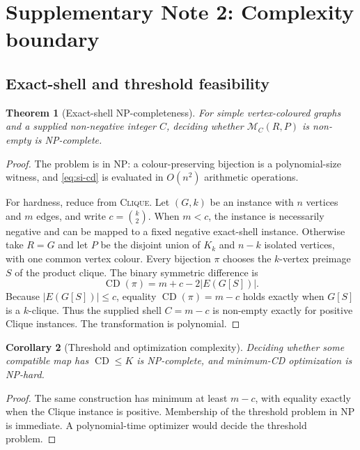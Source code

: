 \documentclass[11pt]{article}
\newtheorem{theorem}{Theorem}[section]
\newtheorem{corollary}[theorem]{Corollary}
\theoremstyle{definition}
\newcommand{\CD}{\operatorname{CD}}
\begin{document}
\section{Supplementary Note 2: Complexity boundary}

\subsection{Exact-shell and threshold feasibility}

\begin{theorem}[Exact-shell NP-completeness]
For simple vertex-coloured graphs and a supplied non-negative integer \(C\),
deciding whether \(\mathcal M_C(R,P)\) is non-empty is NP-complete.
\label{thm:si-exact-np}
\end{theorem}

\begin{proof}
The problem is in NP: a colour-preserving bijection is a polynomial-size
witness, and \cref{eq:si-cd} is evaluated in \(O(n^2)\) arithmetic operations.

For hardness, reduce from \textsc{Clique}.  Let \((G,k)\) be an instance with
\(n\) vertices and \(m\) edges, and write \(c=\binom{k}{2}\).  When \(m<c\),
the instance is necessarily negative and can be mapped to a fixed negative
exact-shell instance.  Otherwise take \(R=G\) and let \(P\) be the disjoint
union of \(K_k\) and \(n-k\) isolated vertices, with one common vertex colour.
Every bijection \(\pi\) chooses the \(k\)-vertex preimage \(S\) of the product
clique.  The binary symmetric difference is
\[
 \CD(\pi)=m+c-2|E(G[S])|.
\]
Because \(|E(G[S])|\leq c\), equality
\(\CD(\pi)=m-c\) holds exactly when \(G[S]\) is a \(k\)-clique.  Thus the
supplied shell \(C=m-c\) is non-empty exactly for positive Clique instances.
The transformation is polynomial.
\end{proof}

\begin{corollary}[Threshold and optimization complexity]
Deciding whether some compatible map has \(\CD\leq K\) is NP-complete, and
minimum-CD optimization is NP-hard.
\end{corollary}

\begin{proof}
The same construction has minimum at least \(m-c\), with equality exactly
when the Clique instance is positive.  Membership of the threshold problem in
NP is immediate.  A polynomial-time optimizer would decide the threshold
problem.
\end{proof}
\end{document}
